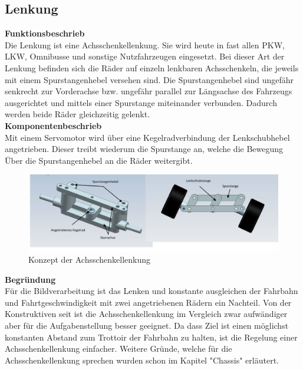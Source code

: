 \subsection{Lenkung}

\textbf{Funktionsbeschrieb}
\\[0.2cm]
Die Lenkung ist eine Achsschenkellenkung. Sie wird heute in fast allen PKW, LKW, Omnibusse und sonstige Nutzfahrzeugen eingesetzt. Bei dieser Art der Lenkung befinden sich die Räder auf einzeln lenkbaren Achsschenkeln, die jeweils mit einem Spurstangenhebel versehen sind. Die Spurstangenhebel sind ungefähr senkrecht zur Vorderachse bzw. ungefähr parallel zur Längsachse des Fahrzeugs ausgerichtet und mittels einer Spurstange miteinander verbunden. Dadurch werden beide Räder gleichzeitig gelenkt.\\[0.2cm]
\textbf{Komponentenbeschrieb}
\\[0.2cm]
Mit einem Servomotor wird über eine Kegelradverbindung der Lenkschubhebel angetrieben. Dieser treibt wiederum die Spurstange an, welche die Bewegung Über die Spurstangenhebel an die Räder weitergibt.
\begin{figure}[H]%
\centering
\includegraphics[width=1\textwidth]{03_Loesungskonzept/pictures/Achsschenkellenkung.JPG}
\caption{Konzept der Achsschenkellenkung}
\label{fig:activityRoute}
\end{figure}

\textbf{Begründung}\\[0.2cm]
Für die Bildverarbeitung ist das Lenken und konstante ausgleichen der Fahrbahn und Fahrtgeschwindigkeit mit zwei angetriebenen Rädern ein Nachteil. Von der Konstruktiven seit ist die Achsschenkellenkung im Vergleich zwar aufwändiger aber für die Aufgabenstellung besser geeignet. Da dass Ziel ist einen möglichst konstanten Abstand zum Trottoir der Fahrbahn zu halten, ist die Regelung einer Achsschenkellenkung einfacher. Weitere Gründe, welche für die Achsschenkellenkung sprechen wurden schon im Kapitel "Chassis" erläutert.
